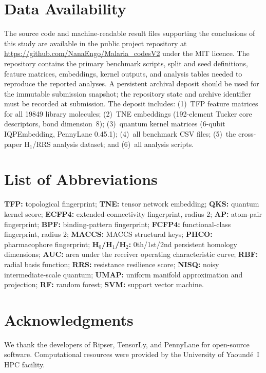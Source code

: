 \documentclass[11pt,a4paper]{article}
\begin{document}
\section*{Data Availability}

The source code and machine-readable result files supporting the conclusions of this study are available in the public project repository at \url{https://github.com/NanaEngo/Malaria_codesV2} under the MIT licence. The repository contains the primary benchmark scripts, split and seed definitions, feature matrices, embeddings, kernel outputs, and analysis tables needed to reproduce the reported analyses. A persistent archival deposit should be used for the immutable submission snapshot; the repository state and archive identifier must be recorded at submission. The deposit includes: (1)~TFP feature matrices for all \num{19849} library molecules; (2)~TNE embeddings (\num{192}-element Tucker core descriptors, bond dimension~8); (3)~quantum kernel matrices (6-qubit IQPEmbedding, PennyLane 0.45.1); (4)~all benchmark CSV files; (5)~the cross-paper H$_1$/RRS analysis dataset; and (6)~all analysis scripts.

\section*{List of Abbreviations}

\textbf{TFP:} topological fingerprint; \textbf{TNE:} tensor network embedding; \textbf{QKS:} quantum kernel score; \textbf{ECFP4:} extended-connectivity fingerprint, radius 2; \textbf{AP:} atom-pair fingerprint; \textbf{BPF:} binding-pattern fingerprint; \textbf{FCFP4:} functional-class fingerprint, radius 2; \textbf{MACCS:} MACCS structural keys; \textbf{PHCO:} pharmacophore fingerprint; \textbf{H$_0$/H$_1$/H$_2$:} 0th/1st/2nd persistent homology dimensions; \textbf{AUC:} area under the receiver operating characteristic curve; \textbf{RBF:} radial basis function; \textbf{RRS:} resistance resilience score; \textbf{NISQ:} noisy intermediate-scale quantum; \textbf{UMAP:} uniform manifold approximation and projection; \textbf{RF:} random forest; \textbf{SVM:} support vector machine.

\section*{Acknowledgments}

We thank the developers of Ripser, TensorLy, and PennyLane for open-source software. Computational resources were provided by the University of Yaound\'{e}~I HPC facility.
\end{document}
